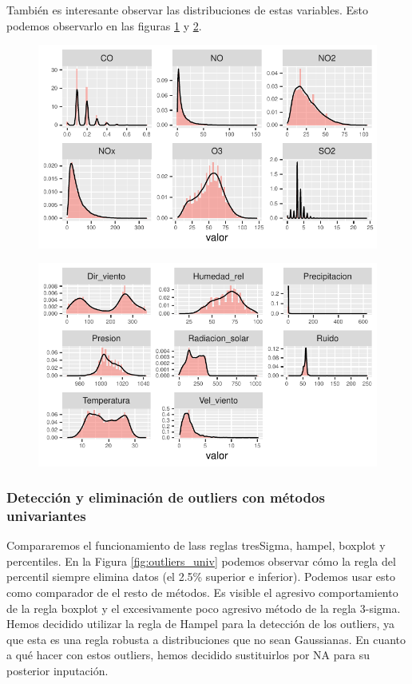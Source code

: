 \documentclass[notspecified,article,submit,moreauthors,pdftex]{Definitions/mdpi}
\begin{document}
También es interesante observar las distribuciones de estas variables.
Esto podemos observarlo en las figuras \ref{fig:densidades1} y
\ref{fig:densidades2}.

\begin{figure}

\includegraphics[width=0.7\linewidth]{ProyectoAED2023_files/figure-latex/densidades1-1} \hfill{}

\caption{\label{fig:densidades1}}\label{fig:densidades1}
\end{figure}

\begin{figure}

\includegraphics[width=0.7\linewidth]{ProyectoAED2023_files/figure-latex/densidades2-1} \hfill{}

\caption{\label{fig:densidades2}}\label{fig:densidades2}
\end{figure}

\hypertarget{detecciuxf3n-y-eliminaciuxf3n-de-outliers-con-muxe9todos-univariantes}{%
\subsubsection{Detección y eliminación de outliers con métodos
univariantes}\label{detecciuxf3n-y-eliminaciuxf3n-de-outliers-con-muxe9todos-univariantes}}

Compararemos el funcionamiento de lass reglas tresSigma, hampel, boxplot
y percentiles. En la Figura \ref{fig:outliers_univ} podemos observar
cómo la regla del percentil siempre elimina datos (el 2.5\% superior e
inferior). Podemos usar esto como comparador de el resto de métodos. Es
visible el agresivo comportamiento de la regla boxplot y el
excesivamente poco agresivo método de la regla 3-sigma. Hemos decidido
utilizar la regla de Hampel para la detección de los outliers, ya que
esta es una regla robusta a distribuciones que no sean Gaussianas. En
cuanto a qué hacer con estos outliers, hemos decidido sustituirlos por
NA para su posterior inputación.
\end{document}

